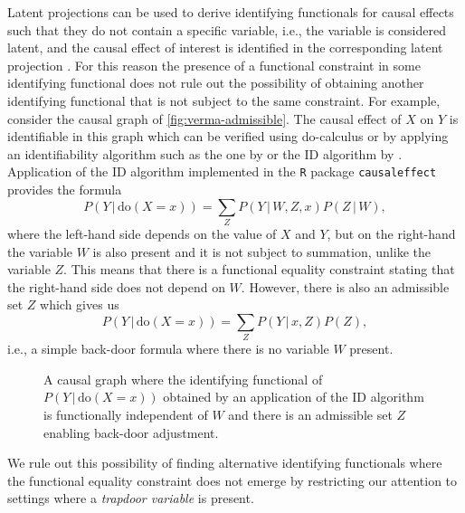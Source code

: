 \documentclass{statsoc}
\newcommand{\+}[1]{\ensuremath{\mathbf{#1}}}
\newcommand{\doo}{\textrm{do}}
\newcommand{\given}{{ \, | \, }}
\begin{document}
Latent projections can be used to derive identifying functionals for causal effects such that they do not contain a specific variable, i.e., the variable is considered latent, and the causal effect of interest is identified in the corresponding latent projection \citep{tikka18}. For this reason the presence of a functional constraint in some identifying functional does not rule out the possibility of obtaining another identifying functional that is not subject to the same constraint. For example, consider the causal graph of \autoref{fig:verma-admissible}. The causal effect of $X$ on $Y$ is identifiable in this graph which can be verified using do-calculus or by applying an identifiability algorithm such as the one by \citet{huangvaltorta:complete} or the ID algorithm by \citet{Shpitser2006}. Application of the ID algorithm implemented in the \texttt{R} package \texttt{causaleffect} \citep{TikkaKarvanen2017} provides the formula
\[
 P(Y \given \doo(X = x)) = \sum_{Z} P(Y \given W,Z,x) P(Z \given W),
\]
where the left-hand side depends on the value of $X$ and $Y$, but on the right-hand the variable $W$ is also present and it is not subject to summation, unlike the variable $Z$. This means that there is a functional equality constraint stating that the right-hand side does not depend on $W$. However, there is also an admissible set $Z$ which gives us
\begin{equation*} 
P(Y \given \doo(X = x)) = \sum_{Z}P(Y\given x, Z)P(Z),
\end{equation*}
i.e., a simple back-door formula where there is no variable $W$ present.
\begin{figure}[!h]
\centering
{}
\caption{A causal graph where the identifying functional of $P(Y \given \doo(X = x))$ obtained by an application of the ID algorithm is functionally independent of $W$ and there is an admissible set $Z$ enabling back-door adjustment.}
\label{fig:verma-admissible}
\end{figure}
We rule out this possibility of finding alternative identifying functionals where the functional equality constraint does not emerge by restricting our attention to settings where a \emph{trapdoor variable} is present.
\end{document}
